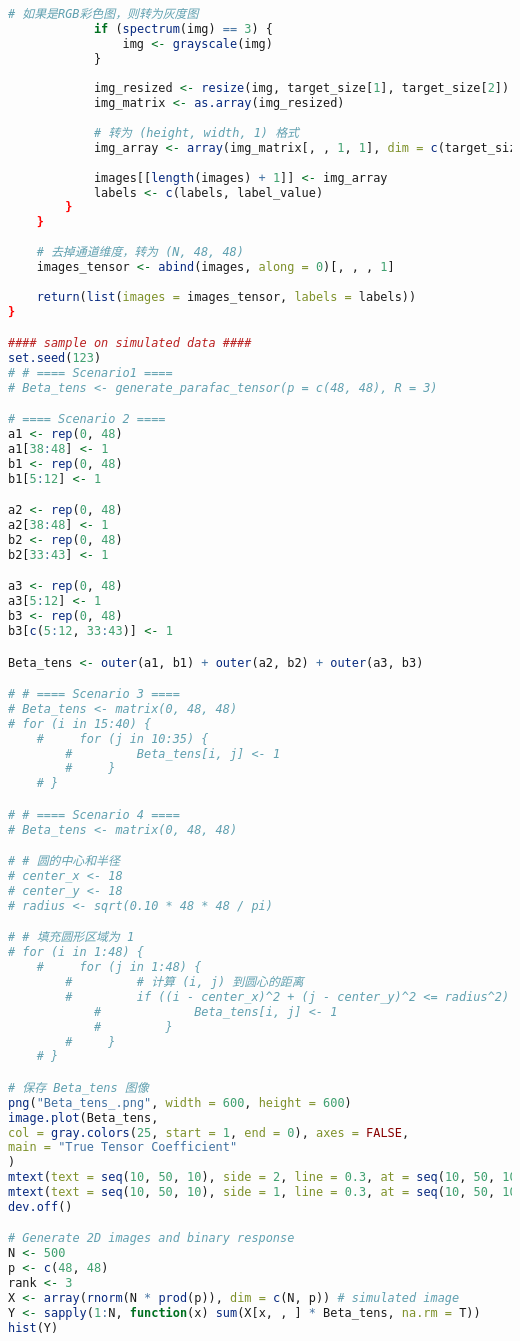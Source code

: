 \documentclass[AutoFakeBold]{LZUThesis}
\begin{document}
\begin{lstlisting}[language = R, caption = {BT-LR}算法]
			# 如果是RGB彩色图，则转为灰度图
			if (spectrum(img) == 3) {
				img <- grayscale(img)
			}
			
			img_resized <- resize(img, target_size[1], target_size[2])
			img_matrix <- as.array(img_resized)
			
			# 转为 (height, width, 1) 格式
			img_array <- array(img_matrix[, , 1, 1], dim = c(target_size[2], target_size[1], 1))
			
			images[[length(images) + 1]] <- img_array
			labels <- c(labels, label_value)
		}
	}
	
	# 去掉通道维度，转为 (N, 48, 48)
	images_tensor <- abind(images, along = 0)[, , , 1]
	
	return(list(images = images_tensor, labels = labels))
}

#### sample on simulated data ####
set.seed(123)
# # ==== Scenario1 ====
# Beta_tens <- generate_parafac_tensor(p = c(48, 48), R = 3)

# ==== Scenario 2 ====
a1 <- rep(0, 48)
a1[38:48] <- 1
b1 <- rep(0, 48)
b1[5:12] <- 1

a2 <- rep(0, 48)
a2[38:48] <- 1
b2 <- rep(0, 48)
b2[33:43] <- 1

a3 <- rep(0, 48)
a3[5:12] <- 1
b3 <- rep(0, 48)
b3[c(5:12, 33:43)] <- 1

Beta_tens <- outer(a1, b1) + outer(a2, b2) + outer(a3, b3)

# # ==== Scenario 3 ====
# Beta_tens <- matrix(0, 48, 48)
# for (i in 15:40) {
	#     for (j in 10:35) {
		#         Beta_tens[i, j] <- 1
		#     }
	# }

# # ==== Scenario 4 ====
# Beta_tens <- matrix(0, 48, 48)

# # 圆的中心和半径
# center_x <- 18
# center_y <- 18
# radius <- sqrt(0.10 * 48 * 48 / pi)

# # 填充圆形区域为 1
# for (i in 1:48) {
	#     for (j in 1:48) {
		#         # 计算 (i, j) 到圆心的距离
		#         if ((i - center_x)^2 + (j - center_y)^2 <= radius^2) {
			#             Beta_tens[i, j] <- 1
			#         }
		#     }
	# }

# 保存 Beta_tens 图像
png("Beta_tens_.png", width = 600, height = 600)
image.plot(Beta_tens,
col = gray.colors(25, start = 1, end = 0), axes = FALSE,
main = "True Tensor Coefficient"
)
mtext(text = seq(10, 50, 10), side = 2, line = 0.3, at = seq(10, 50, 10) / 48, las = 1, cex = 0.8)
mtext(text = seq(10, 50, 10), side = 1, line = 0.3, at = seq(10, 50, 10) / 48, las = 2, cex = 0.8)
dev.off()

# Generate 2D images and binary response
N <- 500
p <- c(48, 48)
rank <- 3
X <- array(rnorm(N * prod(p)), dim = c(N, p)) # simulated image
Y <- sapply(1:N, function(x) sum(X[x, , ] * Beta_tens, na.rm = T))
hist(Y)


\end{lstlisting}
\end{document}
